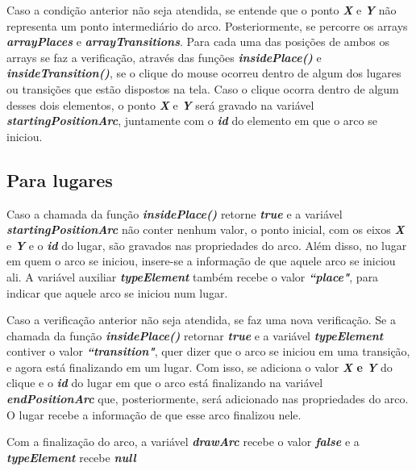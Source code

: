 \documentclass[
	12pt,				%
	openright,			%
	oneside,			%
	a4paper,			%
	english,			%
	brazil				%
	]{abntex2}
\theoremstyle{doispontos}
\begin{document}
Caso a condição anterior não seja atendida, se entende que o ponto \textbf{\textit{X}} e \textbf{\textit{Y}} não representa um ponto intermediário do arco. Posteriormente, se percorre os arrays \textbf{\textit{arrayPlaces}} e \textbf{\textit{arrayTransitions}}. Para cada uma das posições de ambos os arrays se faz a verificação, através das funções \textbf{\textit{insidePlace()}} e \textbf{\textit{insideTransition()}}, se o clique do mouse ocorreu dentro de algum dos lugares ou transições que estão dispostos na tela. Caso o clique ocorra dentro de algum desses dois elementos, o ponto \textbf{\textit{X}} e \textbf{\textit{Y}} será gravado na variável \textbf{\textit{startingPositionArc}}, juntamente com o \textbf{\textit{id}} do elemento em que o arco se iniciou. 

\subsection{Para lugares}

Caso a chamada da função \textbf{\textit{insidePlace()}} retorne \textbf{\textit{true}} e a variável \textbf{\textit{startingPositionArc}} não conter nenhum valor, o ponto inicial, com os eixos \textbf{\textit{X}} e \textbf{\textit{Y}} e o \textbf{\textit{id}} do lugar, são gravados nas propriedades do arco. Além disso, no lugar em quem o arco se iniciou, insere-se a informação de que aquele arco se iniciou ali. A variável auxiliar \textbf{\textit{typeElement}} também recebe o valor \textbf{\textit{``place"}}, para indicar que aquele arco se iniciou num lugar. 

Caso a verificação anterior não seja atendida, se faz uma nova verificação. Se a chamada da função \textbf{\textit{insidePlace()}} retornar \textbf{\textit{true}} e a variável \textbf{\textit{typeElement}} contiver o valor \textbf{\textit{``transition"}}, quer dizer que o arco se iniciou em uma transição, e agora está finalizando em um lugar. Com isso, se adiciona o valor \textbf{\textit{X} e \textbf{\textit{Y}}} do clique e o \textbf{\textit{id}} do lugar em que o arco está finalizando na variável \textbf{\textit{endPositionArc}} que, posteriormente, será adicionado nas propriedades do arco. O lugar recebe a informação de que esse arco finalizou nele.

Com a finalização do arco, a variável \textbf{\textit{drawArc}} recebe o valor \textbf{\textit{false}} e a \textbf{\textit{typeElement}} recebe \textbf{\textit{null}}


\end{document}
